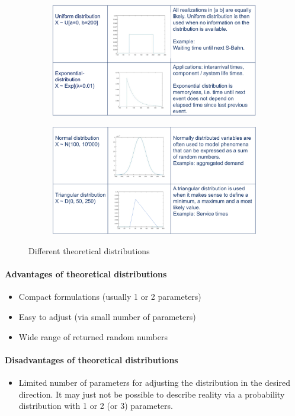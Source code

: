 \begin{figure}[H]
	\begin{subfigure}{\textwidth}
		\centering
		\includegraphics[width=.7\textwidth]{figures/TheoreticalDistributions1.png}
	\end{subfigure}
	\begin{subfigure}{\textwidth}
		\centering
		\includegraphics[width=.7\textwidth]{figures/TheoreticalDistributions2.png}
	\end{subfigure}
	\caption{Different theoretical distributions}
\end{figure}

\paragraph{Advantages of theoretical distributions}
\begin{itemize}
	\tightlist
	\item Compact formulations (usually 1 or 2 parameters)
	\item Easy to adjust (via small number of parameters)
	\item Wide range of returned random numbers
\end{itemize}

\paragraph{Disadvantages of theoretical distributions}
\begin{itemize}
	\tightlist
	\item Limited number of parameters for adjusting the distribution in the
	desired direction. It may just not be possible to describe reality via a
	probability distribution with 1 or 2 (or 3) parameters.
\end{itemize}

